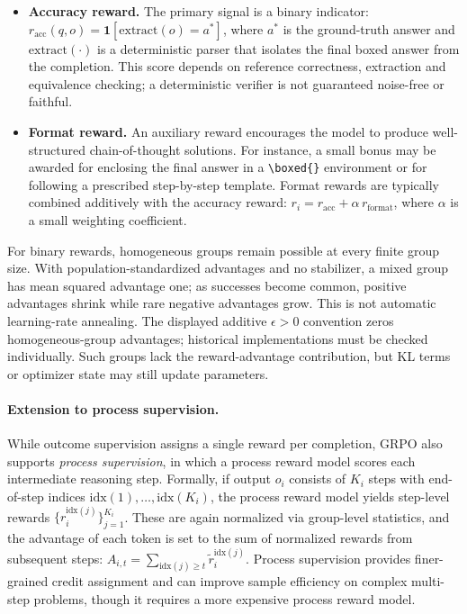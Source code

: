 \begin{itemize}[leftmargin=1.8em,itemsep=2pt]
\item \textbf{Accuracy reward.}  The primary signal is a binary indicator:
      $r_{\text{acc}}(q, o) = \mathbf{1}[\text{extract}(o) = a^*]$, where
      $a^*$ is the ground-truth answer and $\text{extract}(\cdot)$ is a
      deterministic parser that isolates the final boxed answer from the
      completion.  This score depends on reference correctness, extraction and equivalence checking; a deterministic verifier is not guaranteed noise-free or faithful.
\item \textbf{Format reward.}  An auxiliary reward encourages the model
      to produce well-structured chain-of-thought solutions.  For
      instance, a small bonus may be awarded for enclosing the final
      answer in a \verb|\boxed{}| environment or for following a
      prescribed step-by-step template.  Format rewards are typically
      combined additively with the accuracy reward:
      $r_i = r_{\text{acc}} + \alpha\, r_{\text{format}}$, where $\alpha$
      is a small weighting coefficient.
\end{itemize}

\noindent
For binary rewards, homogeneous groups remain possible at every finite group size. With population-standardized advantages and no stabilizer, a mixed group has mean squared advantage one; as successes become common, positive advantages shrink while rare negative advantages grow. This is not automatic learning-rate annealing. The displayed additive $\epsilon>0$ convention zeros homogeneous-group advantages; historical implementations must be checked individually. Such groups lack the reward-advantage contribution, but KL terms or optimizer state may still update parameters.

\paragraph{Extension to process supervision.}
While outcome supervision assigns a single reward per completion, GRPO
also supports \emph{process supervision}, in which a process reward model
scores each intermediate reasoning step.  Formally, if output $o_i$
consists of $K_i$ steps with end-of-step indices
$\text{idx}(1), \ldots, \text{idx}(K_i)$, the process reward model yields
step-level rewards $\{r^{\text{idx}(j)}_i\}_{j=1}^{K_i}$.  These are
again normalized via group-level statistics, and the advantage of each
token is set to the sum of normalized rewards from subsequent steps:
$\hat{A}_{i,t} = \sum_{\text{idx}(j) \geq t} \tilde{r}^{\text{idx}(j)}_i$.
Process supervision provides finer-grained credit assignment and can
improve sample efficiency on complex multi-step problems, though it
requires a more expensive process reward model.

